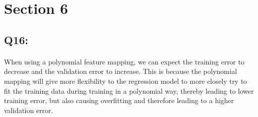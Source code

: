 \documentclass{article}
\begin{document}
\section*{Section 6}
\subsection*{Q16:}
    \paragraph*{}
    When using a polynomial feature mapping, we can expect the training error to decrease and the validation error to increase. This is because the polynomial mapping will give more flexibility to the regression model to more closely try to fit the training data during training in a polynomial way, thereby leading to lower training error, but also causing overfitting and therefore leading to a higher validation error.
\end{document}
